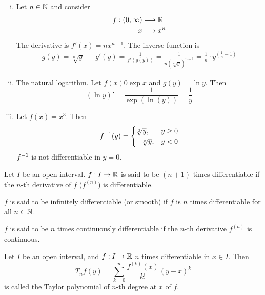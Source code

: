 \documentclass[../../script.tex]{subfiles}
\begin{document}
\begin{eg}
    \begin{enumerate}[(i)]
        \item Let $n \in \mathbb{N}$ and consider 
        \begin{align*}
            f: (0, \infty) &\longrightarrow \mathbb{R} \\
            x &\longmapsto x^n
        \end{align*}
        The derivative is $f'(x) = nx^{n-1}$. The inverse function is 
        \begin{align*}
            g(y) = \sqrt[n]{y} && g'(y) = \frac{1}{f'(g(y))} = \frac{1}{n\left(\sqrt[n]{y}\right)^{n-1}} = \frac{1}{n} \cdot y^{\left(\frac{1}{n} - 1\right)}
        \end{align*}

        \item The natural logarithm. Let $f(x) 0 \exp x$ and $g(y) = \ln y$. Then 
        \[
            (\ln y)' = \frac{1}{\exp(\ln(y))} = \frac{1}{y}
        \]

        \item Let $f(x) = x^3$. Then 
        \[
            {f}^{-1}(y) = \begin{cases}
                \sqrt[3]{y}, & y \ge 0 \\
                -\sqrt[3]{y}, & y < 0
            \end{cases}
        \]
        ${f}^{-1}$ is not differentiable in $y = 0$.
    \end{enumerate}
\end{eg}

\begin{defi}
    Let $I$ be an open interval. $f: I \rightarrow \mathbb{R}$ is said to be $(n+1)$-times differentiable if the $n$-th derivative of $f$ ($f^{(n)}$) is differentiable.
    
    $f$ is said to be infinitely differentiable (or smooth) if $f$ is $n$ times differentiable for all $n \in \mathbb{N}$.

    $f$ is said to be $n$ times continuously differentiable if the $n$-th derivative $f^{(n)}$ is continuous.
\end{defi}

\begin{defi}
    Let $I$ be an open interval, and $f: I \rightarrow \mathbb{R}$ $n$ times differentiable in $x \in I$. Then 
    \[
        T_n f(y) = \sum_{k=0}^n \frac{f^{(k)} (x)}{k!} (y - x)^k
    \]
    is called the Taylor polynomial of $n$-th degree at $x$ of $f$.
\end{defi}
\end{document}
